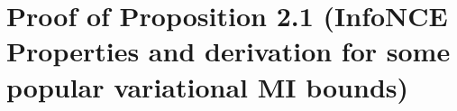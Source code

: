 \documentclass{article}
\theoremstyle{plain}
\theoremstyle{definition}
\theoremstyle{remark}
\begin{document}
		\renewcommand{\thetable}{S\arabic{table}}
		\renewcommand{\thefigure}{S\arabic{figure}}
		\renewcommand{\theequation}{S\arabic{equation}}
		
		
		
		\section{Proof of Proposition 2.1 (InfoNCE Properties and derivation for some popular variational MI bounds)}
		\label{sec:infonce_appendix}
		
\end{document}

